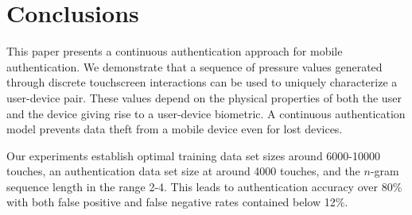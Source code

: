 \documentclass{acm_proc_article-sp}
\begin{document}
\section{Conclusions}
\label{sec:conclusions}
This paper presents a continuous authentication approach for mobile authentication.
We demonstrate that a sequence of pressure values generated through
discrete touchscreen interactions can be used to 
uniquely characterize a user-device pair.
%
These values depend on the physical properties
of both the user and the device 
giving rise to a user-device biometric.
%
A continuous authentication model prevents data theft 
from a mobile device even for lost devices.





Our experiments establish optimal 
training data set sizes around 6000-10000 touches, 
an authentication data set size at around 4000 touches, and 
the $n$-gram sequence length in the range 2-4. This leads to
authentication accuracy over 80\% with both false positive and 
false negative rates contained below 12\%.


%

\end{document}
